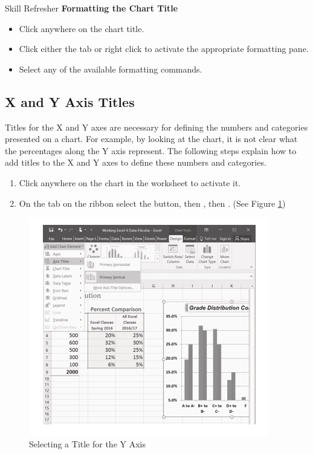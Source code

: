 \begin{center}
	\begin{sklbox}{Skill Refresher}
		\textbf{Formatting the Chart Title}
		\\
		\begin{itemize}
			\setlength{\itemsep}{0pt}
			\setlength{\parskip}{0pt}
			\setlength{\parsep}{0pt}

			\item Click anywhere on the chart title.
			\item Click either the  tab or right click to activate the appropriate formatting pane.
			\item Select any of the available formatting commands.
			
		\end{itemize}
	\end{sklbox}
\end{center}

\subsection{X and Y Axis Titles}

Titles for the X and Y axes are necessary for defining the numbers and categories presented on a chart. For example, by looking at the  chart, it is not clear what the percentages along the Y axis represent. The following steps explain how to add titles to the X and Y axes to define these numbers and categories.

\begin{enumerate}
	\item Click anywhere on the  chart in the  worksheet to activate it.
	\item On the  tab on the ribbon select the  button, then , then . (See Figure \ref{04:fig33})
\end{enumerate}

\begin{figure}[H]
	\centering
	\includegraphics[width=\maxwidth{.95\linewidth}]{gfx/ch04_fig33}
	\caption{Selecting a Title for the Y Axis}
	\label{04:fig33}
\end{figure}

